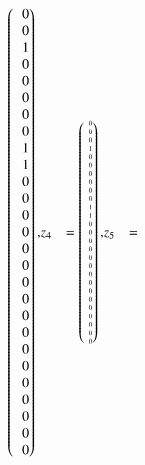\begin{beispiel}
{\begin{align*}
\begin{pmatrix*}[r]
\phantom{-}
 0\\
 0\\
 1\\
 0\\
 0\\
 0\\
 0\\
 0\\
 1\\
 1\\
 0\\
 0\\
 0\\
 0\\
 0\\
 0\\
 0\\
 0\\
 0\\
 0\\
 0\\
 0\\
 0\\
 0\\
 0\\
 0\\
 0
\end{pmatrix*},
&z_4 %
&=
\tiny
\begin{pmatrix*}[r]
\phantom{-}
 0\\
 0\\
 0\\
 1\\
 0\\
 0\\
 0\\
 0\\
 0\\
 0\\
 1\\
 1\\
 0\\
 0\\
 0\\
 0\\
 0\\
 0\\
 0\\
 0\\
 0\\
 0\\
 0\\
 0\\
 0\\
 0\\
 0
\end{pmatrix*},
&z_5 %
&=

\end{align*}}
\end{beispiel}
